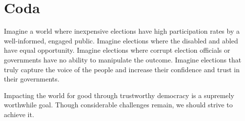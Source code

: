 \section*{Coda}


Imagine a world where inexpensive elections have high participation
rates by a well-informed, engaged public. Imagine elections where the
disabled and abled have equal opportunity. Imagine elections where
corrupt election officials or governments have no ability to
manipulate the outcome. Imagine elections that truly capture the voice
of the people and increase their confidence and trust in their
governments.

Impacting the world for good through trustworthy democracy is a
supremely worthwhile goal. Though considerable challenges remain, we
should strive to achieve it.
